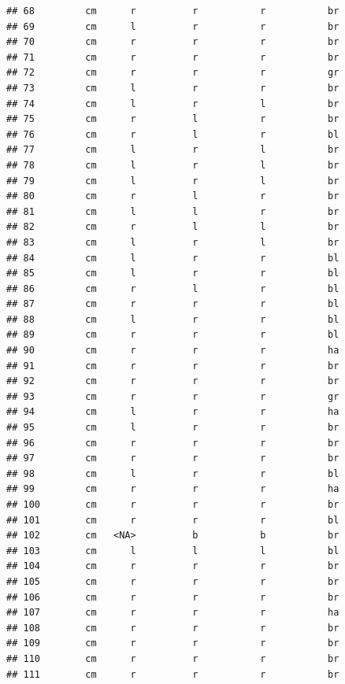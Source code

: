 \documentclass[]{article}
\begin{document}
\begin{verbatim}
## 68         cm      r          r           r           br
## 69         cm      l          r           r           br
## 70         cm      r          r           r           br
## 71         cm      r          r           r           br
## 72         cm      r          r           r           gr
## 73         cm      l          r           r           br
## 74         cm      l          r           l           br
## 75         cm      r          l           r           br
## 76         cm      r          l           r           bl
## 77         cm      l          r           l           br
## 78         cm      l          r           l           br
## 79         cm      l          r           l           br
## 80         cm      r          l           r           br
## 81         cm      l          l           r           br
## 82         cm      r          l           l           br
## 83         cm      l          r           l           br
## 84         cm      l          r           r           bl
## 85         cm      l          r           r           bl
## 86         cm      r          l           r           bl
## 87         cm      r          r           r           bl
## 88         cm      l          r           r           bl
## 89         cm      r          r           r           bl
## 90         cm      r          r           r           ha
## 91         cm      r          r           r           br
## 92         cm      r          r           r           br
## 93         cm      r          r           r           gr
## 94         cm      l          r           r           ha
## 95         cm      l          r           r           br
## 96         cm      r          r           r           br
## 97         cm      r          r           r           br
## 98         cm      l          r           r           bl
## 99         cm      r          r           r           ha
## 100        cm      r          r           r           br
## 101        cm      r          r           r           bl
## 102        cm   <NA>          b           b           br
## 103        cm      l          l           l           bl
## 104        cm      r          r           r           br
## 105        cm      r          r           r           br
## 106        cm      r          r           r           br
## 107        cm      r          r           r           ha
## 108        cm      r          r           r           br
## 109        cm      r          r           r           br
## 110        cm      r          r           r           br
## 111        cm      r          r           r           br

\end{verbatim}
\end{document}
